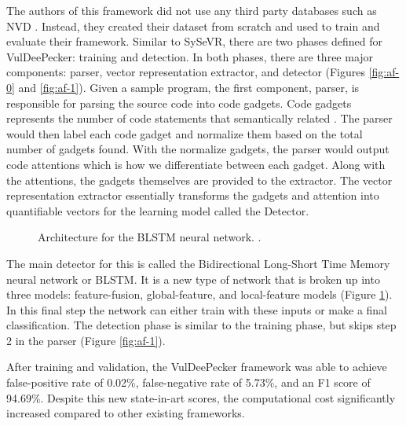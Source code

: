 \documentclass[12pt,twocolumn,letterpaper]{article}
\begin{document}
The authors of this framework did not use any third party databases such as NVD \cite{Nist00,Zou21}. Instead, 
they created their dataset from scratch and used to train and evaluate their framework. Similar to SySeVR, 
there are two phases defined for VulDeePecker: training and detection. In both phases, there are three major
components: parser, vector representation extractor, and detector (Figures \ref{fig:af-0} and \ref{fig:af-1}). 
Given a sample program, the first component, parser, is responsible for parsing the source code into code gadgets. 
Code gadgets represents the number of code statements that semantically related \cite{Zou21}. The parser would then 
label each code gadget and normalize them based on the total number of gadgets found. With the normalize gadgets, 
the parser would output code attentions which is how we differentiate between each gadget. Along with the attentions,
the gadgets themselves are provided to the extractor. The vector representation extractor essentially transforms the 
gadgets and attention into quantifiable vectors for the learning model called the Detector. 

\begin{figure}[h]
    \centering
    \caption{Architecture for the BLSTM neural network. \cite{Zou21}.}
    \label{fig:af-2}
\end{figure}

The main detector for this is called the Bidirectional Long-Short Time Memory neural network or BLSTM. It 
is a new type of network that is broken up into three models: feature-fusion, global-feature, and local-feature 
models (Figure \ref{fig:af-2}). In this final step the network can either train with these inputs or make 
a final classification. The detection phase is similar to the training phase, but skips step 2 in the parser 
(Figure \ref{fig:af-1}). 

After training and validation, the VulDeePecker framework was able to achieve false-positive rate of 
0.02\%, false-negative rate of 5.73\%, and an F1 score of 94.69\%. Despite this new state-in-art scores, 
the computational cost significantly increased compared to other existing frameworks.
\end{document}
